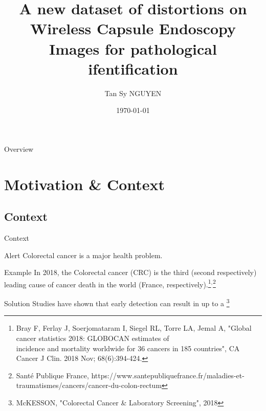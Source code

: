 \documentclass{libs/ufc_format}
\title[A new dataset of distortions on WCE images]{\textbf{A new dataset of distortions on Wireless Capsule Endoscopy Images for pathological ifentification}}
\author{Tan Sy NGUYEN}
\institute[- USPN]{
    \normalsize{\email{tansy.nguyen@math.univ-paris13.fr}}
    \newline
    \department{LAGA, L2TI}
    \newline
    \uspn
}
\date{\today}
\begin{document}


\begin{frame}{}
    \maketitle
\end{frame}

\begin{frame}{Overview}
    \tableofcontents
\end{frame}

\section{Motivation \& Context}
\subsection{Context}

\begin{frame}{Context}
    \begin{alertblock}{Alert}
        Colorectal cancer is a major health problem.
    \end{alertblock}
    \pause
    \begin{block}{Example}
        In 2018, the Colorectal cancer (CRC) is the third (second respectively) leading cause of cancer death in the world (France, respectively).\footnote[frame]{\tiny Bray F, Ferlay J, Soerjomataram I, Siegel RL, Torre LA, Jemal A, "Global cancer statistics 2018: GLOBOCAN estimates of \\ \hspace{0.3cm}incidence and mortality worldwide for 36 cancers in 185 countries", CA Cancer J Clin. 2018 Nov; 68(6):394-424.}$^{,}$\footnote[frame]{\tiny Santé Publique France, https://www.santepubliquefrance.fr/maladies-et-traumatismes/cancers/cancer-du-colon-rectum}
    \end{block}
    \pause
    \begin{exampleblock}{Solution}
        Studies have shown that early detection can result in up to a \footnote[frame]{\tiny McKESSON, "Colorectal Cancer \& Laboratory Screening", 2018}
    \end{exampleblock}

\end{frame}
\end{document}
